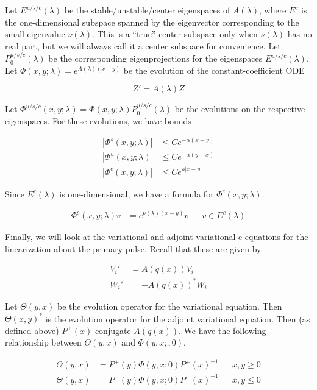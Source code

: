 \documentclass[12pt]{article}
\begin{document}
Let $E^{u/s/c}(\lambda)$ be the stable/unstable/center eigenspaces of $A(\lambda)$, where $E^c$ is the one-dimensional subspace spanned by the eigenvector corresponding to the small eigenvalue $\nu(\lambda)$. This is a ``true'' center subspace only when $\nu(\lambda)$ has no real part, but we will always call it a center subspace for convenience. Let $P^{u/s/c}_0(\lambda)$ be the corresponding eigenprojections for the eigenspaces $E^{u/s/c}(\lambda)$.\\

Let $\Phi(x, y; \lambda) = e^{A(\lambda)(x-y)}$ be the evolution of the constant-coefficient ODE

\[
Z' = A(\lambda) Z
\]

Let $\Phi^{u/s/c}(x, y; \lambda) = \Phi(x, y; \lambda)P^{u/s/c}_0(\lambda)$ be the evolutions on the respective eigenspaces. For these evolutions, we have bounds

\begin{align*}
|\Phi^s(x, y; \lambda)| &\leq C e^{-\alpha(x - y)} \\
|\Phi^u(x, y; \lambda)| &\leq C e^{-\alpha(y - x)} \\
|\Phi^c(x, y; \lambda)| &\leq C e^{\rho|x - y|} 
\end{align*}

Since $E^c(\lambda)$ is one-dimensional, we have a formula for $\Phi^c(x, y; \lambda)$.

\begin{align*}
\Phi^c(x, y; \lambda) v &= e^{\nu(\lambda)(x - y)} v && v \in E^c(\lambda)
\end{align*}

Finally, we will look at the variational and adjoint variational e
equations for the linearization about the primary pulse. Recall that these are given by 

\begin{align*}
V_i' &= A(q(x)) V_i \\
W_i' &= -A(q(x))^* W_i
\end{align*}

Let $\Theta(y, x)$ be the evolution operator for the variational equation. Then $\Theta(x, y)^*$ is the evolution operator for the adjoint variational equation. Then (as defined above) $P^\pm(x)$ conjugate $A(q(x))$. We have the following relationship between $\Theta(y, x)$ and $\Phi(y, x;, 0)$.

\begin{align*}
\Theta(y, x) &= P^+(y) \Phi(y, x; 0) P^+(x)^{-1} && x, y \geq 0 \\
\Theta(y, x) &= P^-(y) \Phi(y, x; 0) P^-(x)^{-1} && x, y \leq 0
\end{align*}
\end{document}
